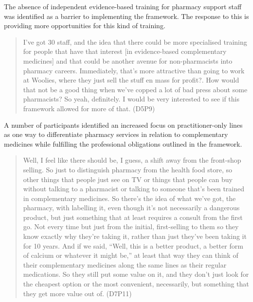 \documentclass[11pt,a4paper]{article}
\begin{document}
The absence of independent evidence-based training for pharmacy support
staff was identified as a barrier to implementing the framework. The
response to this is providing more opportunities for this kind of
training.

\begin{quote}
I've got 30 staff, and the idea that there could be more specialised
training for people that have that interest {[}in evidence-based
complementary medicines{]} and that could be another avenue for
non-pharmacists into pharmacy careers. Immediately, that's more
attractive than going to work at Woolies, where they just sell the stuff
en mass for profit?. How would that not be a good thing when we've
copped a lot of bad press about some pharmacists? So yeah, definitely. I
would be very interested to see if this framework allowed for more of
that. (D5P9)
\end{quote}

A number of participants identified an increased focus on
practitioner-only lines as one way to differentiate pharmacy services in
relation to complementary medicines while fulfilling the professional
obligations outlined in the framework.

\begin{quote}
Well, I feel like there should be, I guess, a shift away from the
front-shop selling. So just to distinguish pharmacy from the health food
store, so other things that people just see on TV or things that people
can buy without talking to a pharmacist or talking to someone that's
been trained in complementary medicines. So there's the idea of what
we've got, the pharmacy, with labelling it, even though it's not
necessarily a dangerous product, but just something that at least
requires a consult from the first go. Not every time but just from the
initial, first-selling to them so they know exactly why they're taking
it, rather than just they've been taking it for 10 years. And if we
said, ``Well, this is a better product, a better form of calcium or
whatever it might be,'' at least that way they can think of their
complementary medicines along the same lines as their regular
medications. So they still put some value on it, and they don't just
look for the cheapest option or the most convenient, necessarily, but
something that they get more value out of. (D7P11)
\end{quote}
\end{document}
